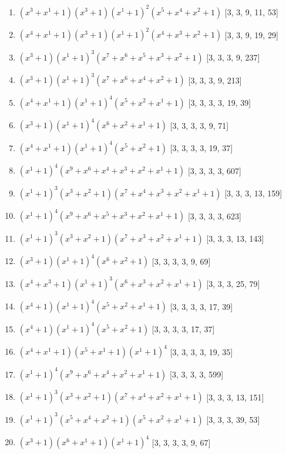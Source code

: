\documentclass[10pt,twocolumn]{article}
\begin{document}
\begin{enumerate}
\item $(x^{3} + x^{1} + 1)(x^{3} + 1)(x^{1} + 1)^{2}(x^{5} + x^{4} + x^{2} + 1)$  [3, 3, 9, 11, 53]
\item $(x^{4} + x^{1} + 1)(x^{3} + 1)(x^{1} + 1)^{2}(x^{4} + x^{3} + x^{2} + 1)$  [3, 3, 9, 19, 29]
\item $(x^{3} + 1)(x^{1} + 1)^{3}(x^{7} + x^{6} + x^{5} + x^{3} + x^{2} + 1)$  [3, 3, 3, 9, 237]
\item $(x^{3} + 1)(x^{1} + 1)^{3}(x^{7} + x^{6} + x^{4} + x^{2} + 1)$  [3, 3, 3, 9, 213]
\item $(x^{4} + x^{1} + 1)(x^{1} + 1)^{4}(x^{5} + x^{2} + x^{1} + 1)$  [3, 3, 3, 3, 19, 39]
\item $(x^{3} + 1)(x^{1} + 1)^{4}(x^{6} + x^{2} + x^{1} + 1)$  [3, 3, 3, 3, 9, 71]
\item $(x^{4} + x^{1} + 1)(x^{1} + 1)^{4}(x^{5} + x^{2} + 1)$  [3, 3, 3, 3, 19, 37]
\item $(x^{1} + 1)^{4}(x^{9} + x^{6} + x^{4} + x^{3} + x^{2} + x^{1} + 1)$  [3, 3, 3, 3, 607]
\item $(x^{1} + 1)^{3}(x^{3} + x^{2} + 1)(x^{7} + x^{4} + x^{3} + x^{2} + x^{1} + 1)$  [3, 3, 3, 13, 159]
\item $(x^{1} + 1)^{4}(x^{9} + x^{6} + x^{5} + x^{3} + x^{2} + x^{1} + 1)$  [3, 3, 3, 3, 623]
\item $(x^{1} + 1)^{3}(x^{3} + x^{2} + 1)(x^{7} + x^{3} + x^{2} + x^{1} + 1)$  [3, 3, 3, 13, 143]
\item $(x^{3} + 1)(x^{1} + 1)^{4}(x^{6} + x^{2} + 1)$  [3, 3, 3, 3, 9, 69]
\item $(x^{4} + x^{3} + 1)(x^{1} + 1)^{3}(x^{6} + x^{3} + x^{2} + x^{1} + 1)$  [3, 3, 3, 25, 79]
\item $(x^{4} + 1)(x^{1} + 1)^{4}(x^{5} + x^{2} + x^{1} + 1)$  [3, 3, 3, 3, 17, 39]
\item $(x^{4} + 1)(x^{1} + 1)^{4}(x^{5} + x^{2} + 1)$  [3, 3, 3, 3, 17, 37]
\item $(x^{4} + x^{1} + 1)(x^{5} + x^{1} + 1)(x^{1} + 1)^{4}$  [3, 3, 3, 3, 19, 35]
\item $(x^{1} + 1)^{4}(x^{9} + x^{6} + x^{4} + x^{2} + x^{1} + 1)$  [3, 3, 3, 3, 599]
\item $(x^{1} + 1)^{3}(x^{3} + x^{2} + 1)(x^{7} + x^{4} + x^{2} + x^{1} + 1)$  [3, 3, 3, 13, 151]
\item $(x^{1} + 1)^{3}(x^{5} + x^{4} + x^{2} + 1)(x^{5} + x^{2} + x^{1} + 1)$  [3, 3, 3, 39, 53]
\item $(x^{3} + 1)(x^{6} + x^{1} + 1)(x^{1} + 1)^{4}$  [3, 3, 3, 3, 9, 67]

\end{enumerate}
\end{document}
